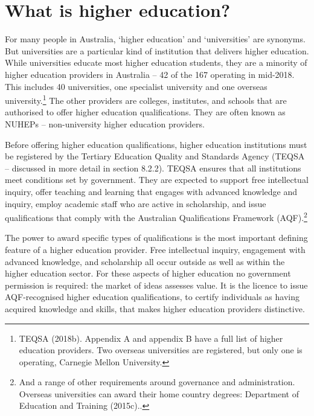 \documentclass[]{book}
\begin{document}
\hypertarget{what-is-higher-education}{%
\section{What is higher education?}\label{what-is-higher-education}}

For many people in Australia, `higher education' and `universities' are synonyms. But universities are a particular kind of institution that delivers higher education. While universities educate most higher education students, they are a minority of higher education providers in Australia -- 42 of the 167 operating in mid-2018. This includes 40 universities, one specialist university and one overseas university.\footnote{TEQSA (2018b). Appendix A and appendix B have a full list of higher education providers. Two overseas universities are registered, but only one is operating, Carnegie Mellon University.} The other providers are colleges, institutes, and schools that are authorised to offer higher education qualifications. They are often known as NUHEPs -- non-university higher education providers.

Before offering higher education qualifications, higher education institutions must be registered by the Tertiary Education Quality and Standards Agency (TEQSA -- discussed in more detail in section 8.2.2). TEQSA ensures that all institutions meet conditions set by government. They are expected to support free intellectual inquiry, offer teaching and learning that engages with advanced knowledge and inquiry, employ academic staff who are active in scholarship, and issue qualifications that comply with the Australian Qualifications Framework (AQF).\footnote{And a range of other requirements around governance and administration. Overseas universities can award their home country degrees: Department of Education and Training (2015c)..}

The power to award specific types of qualifications is the most important defining feature of a higher education provider. Free intellectual inquiry, engagement with advanced knowledge, and scholarship all occur outside as well as within the higher education sector. For these aspects of higher education no government permission is required: the market of ideas assesses value. It is the licence to issue AQF-recognised higher education qualifications, to certify individuals as having acquired knowledge and skills, that makes higher education providers distinctive.
\end{document}
